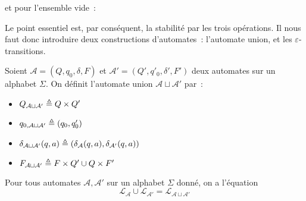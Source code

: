 et pour l'ensemble vide~:

\begin{figure}[h]
  \centering
\end{figure}

Le point essentiel est, par conséquent, la stabilité par les trois opérations.
Il nous faut donc introduire deux constructions d'automates~: l'automate union,
et les $\varepsilon$-transitions.

\begin{definition}
  Soient $\mathcal A = (Q,q_0,\delta,F)$ et
  $\mathcal A' = (Q',q'_0,\delta',F')$ deux automates sur un alphabet
  $\Sigma$. On définit l'automate union $\mathcal A \sqcup \mathcal A'$ par~:
  \begin{itemize}
  \item $Q_{\mathcal A\sqcup \mathcal A'} \triangleq Q\times Q'$
  \item $q_{0,\mathcal A\sqcup \mathcal A'} \triangleq (q_0,q'_0)$
  \item $\delta_{\mathcal A \sqcup \mathcal A'}(q,a) \triangleq (\delta_{\mathcal A}(q,a),
    \delta_{\mathcal A'}(q,a))$
  \item $F_{\mathcal A \sqcup \mathcal A'} \triangleq F\times Q' \cup Q\times F'$
  \end{itemize}
\end{definition}

\begin{proposition}\label{prop.union.ratio}
  Pour tous automates $\mathcal A, \mathcal A'$ sur un alphabet $\Sigma$ donné,
  on a l'équation
  \[\mathcal L_{\mathcal A} \cup \mathcal L_{\mathcal A'} =
  \mathcal L_{\mathcal A \sqcup \mathcal A'}\]
\end{proposition}

